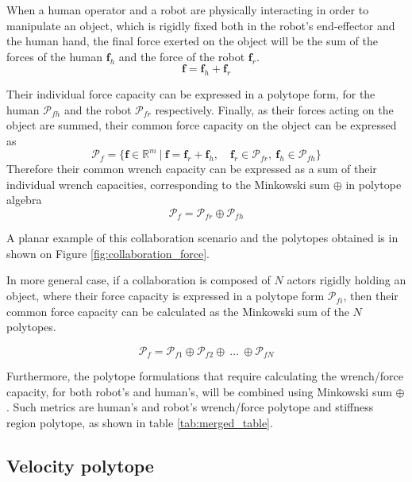 When a human operator and a robot are physically interacting in order to manipulate an object, which is rigidly fixed both in the robot's end-effector and the human hand, the final force exerted on the object will be the sum of the forces of the human $\bm{f}_h$ and the force of the robot $\bm{f}_r$.
\begin{equation}
    \bm{f} = \bm{f}_h + \bm{f}_r
\end{equation}

Their individual force capacity can be expressed in a polytope form, for the human  $\mathcal{P}_{fh}$ and the robot  $\mathcal{P}_{fr}$ respectively. Finally, as their forces acting on the object are summed, their common force capacity on the object can be expressed as
\begin{equation}
    \mathcal{P}_f = \{\bm{f}\in \mathbb{R}^m ~|~\bm{f} = \bm{f}_r + \bm{f}_h , \quad\bm{f}_r \in \mathcal{P}_{fr},~\bm{f}_h \in \mathcal{P}_{fh}\}
\end{equation}
Therefore their common wrench capacity can be expressed as a sum of their individual wrench capacities, corresponding to the Minkowski sum $\oplus$ in polytope algebra 
\begin{equation}
    \mathcal{P}_f = \mathcal{P}_{fr}\oplus \mathcal{P}_{fh}
\end{equation}

A planar example of this collaboration scenario and the polytopes obtained is in shown on Figure \ref{fig:collaboration_force}. 

In more general case, if a collaboration is composed of $N$ actors rigidly holding an object, where their force capacity is expressed in a polytope form $\mathcal{P}_{fi}$, then their common force capacity can be calculated as the Minkowski sum of the $N$ polytopes.

\begin{equation}
    \mathcal{P}_f =  \mathcal{P}_{f1} \oplus \mathcal{P}_{f2} \oplus ~\ldots ~\oplus  \mathcal{P}_{fN}
\end{equation}

Furthermore, the polytope formulations that require calculating the wrench/force capacity, for both robot's and human's, will be combined using Minkowski sum $\oplus$. Such metrics are human's and robot's wrench/force polytope and stiffness region polytope, as shown in table \ref{tab:merged_table}.

\subsection{Velocity polytope}
\label{ch:velocity_collab}

